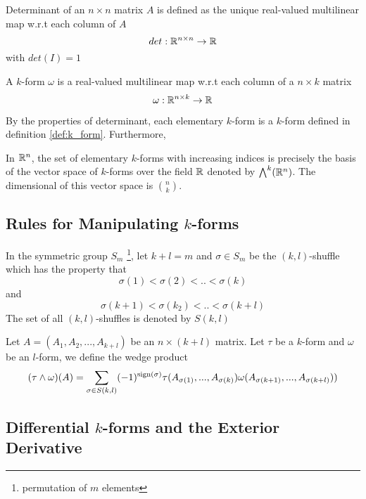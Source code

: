 \documentclass{article}
\begin{document}
\begin{definition}[Determinant]
    Determinant of an $n \times n$ matrix $A$ is defined as the unique real-valued multilinear map w.r.t each column of $A$
    $$
        det: \mathbb{R}^{n \times n} \to \mathbb{R}
    $$
    with $det(I) = 1$
\end{definition}

\begin{definition}[$k$-forms]
    \label{def:k_form}
    A $k$-form $\omega$ is a real-valued multilinear map w.r.t each column of a $n \times k$ matrix
    $$
        \omega: \mathbb{R}^{n \times k} \to \mathbb{R}
    $$
\end{definition}

By the properties of determinant, each elementary $k$-form is a $k$-form defined in definition \ref{def:k_form}. Furthermore, 

\begin{theorem}
    In $\mathbb{R}^n$, the set of elementary $k$-forms with increasing indices is precisely the basis of the vector space of $k$-forms over the field $\mathbb{R}$ denoted by $\bigwedge^k (\mathbb{R}^n)$. The dimensional of this vector space is $n \choose k$. 
\end{theorem}

\subsection{Rules for Manipulating $k$-forms}

\begin{definition}
    In the symmetric group $S_m$ \footnote{permutation of $m$ elements}, let $k+l = m$ and $\sigma \in S_m$ be the $(k, l)$-shuffle which has the property that
    $$
        \sigma(1) < \sigma(2) < .. < \sigma(k)
    $$
    and 
    $$
        \sigma(k+1) < \sigma(k_2) < .. < \sigma(k+l)
    $$
    The set of all $(k, l)$-shuffles is denoted by $S(k, l)$
\end{definition}

\begin{definition}
    Let $A = (A_1, A_2, ..., A_{k+l})$ be an $n \times (k + l)$ matrix. Let $\tau$ be a $k$-form and $\omega$ be an $l$-form, we define the wedge product
    $$
        (\tau \wedge \omega)(A) = \sum_{\sigma \in S(k, l)} (-1)^{\operatorname{sign}(\sigma)} \tau(A_{\sigma(1)}, ..., A_{\sigma(k)}) \omega(A_{\sigma(k+1)}, ..., A_{\sigma(k+l)}))
    $$
    
\end{definition}

\subsection{Differential $k$-forms and the Exterior Derivative}
\end{document}
